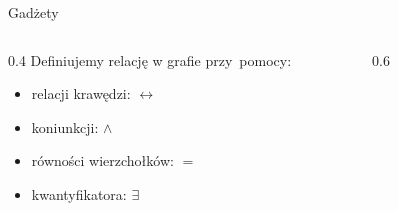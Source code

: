\begin{frame}{Gadżety}
\begin{columns}
    \begin{column}{0.4\textwidth}
    Definiujemy relację w grafie przy~pomocy:
        \begin{itemize}
            \item relacji krawędzi: \(\longleftrightarrow\)
            \item koniunkcji: \(\land\)
            \item równości wierzchołków: \(=\)
            \item kwantyfikatora: \(\exists\)
        \end{itemize}
    \end{column}
    \begin{column}{0.6\textwidth}
    \begin{figure}
        \centering
        
    \end{figure}
    \vspace{-2em}
    \end{column}

\end{columns}
\end{frame}